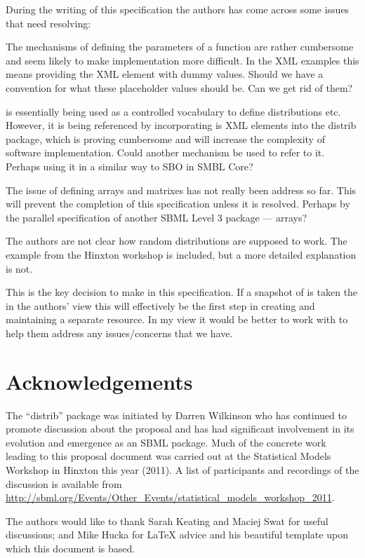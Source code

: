 \documentclass[draftspec]{sbmlpkgspec}
\begin{document}
During the writing of this specification the authors has come across
some issues that need resolving:

\begin{description}
\item[Distribution function parameters] The mechanisms of defining the
  parameters of a function are rather cumbersome and seem likely to
  make implementation more difficult. In the XML examples this means
  providing the \uncertml XML element with dummy values. Should we
  have a convention for what these placeholder values should be. Can
  we get rid of them?
\item[\uncertml is a Controlled Vocabulary] \uncertml is essentially
  being used as a controlled vocabulary to define distributions
  etc. However, it is being referenced by incorporating is XML
  elements into the distrib package, which is proving cumbersome and
  will increase the complexity of software implementation. Could
  another mechanism be used to refer to it. Perhaps using it in a
  similar way to SBO in SMBL Core?
\item The issue of defining arrays and matrixes has not really been
  address so far. This will prevent the completion of this
  specification unless it is resolved. Perhaps by the parallel
  specification of another SBML Level 3 package --- arrays?
\item The authors are not clear how random distributions are supposed to
  work. The example from the Hinxton workshop is included, but a more
  detailed explanation is not.
\item[\uncertml to snapshot or not] This is the key decision to make
  in this specification. If a snapshot of \uncertml is taken the in
  the authors' view this will effectively be the first step in
  creating and maintaining a separate resource. In my view it would be
  better to work with \uncertml to help them address any
  issues/concerns that we have.
\end{description}

\section{Acknowledgements}

The ``distrib'' package was initiated by Darren Wilkinson who has
continued to promote discussion about the proposal and has had
significant involvement in its evolution and emergence as an SBML
package. Much of the concrete work leading to this proposal document
was carried out at the Statistical Models Workshop in Hinxton this
year (2011). A list of participants and recordings of the discussion
is available from
\url{http://sbml.org/Events/Other_Events/statistical_models_workshop_2011}.

The authors would like to thank %
Sarah Keating and Maciej Swat for useful discussions; and Mike Hucka
for \LaTeX{} advice and his beautiful template upon which
this document is based.



\end{document}
